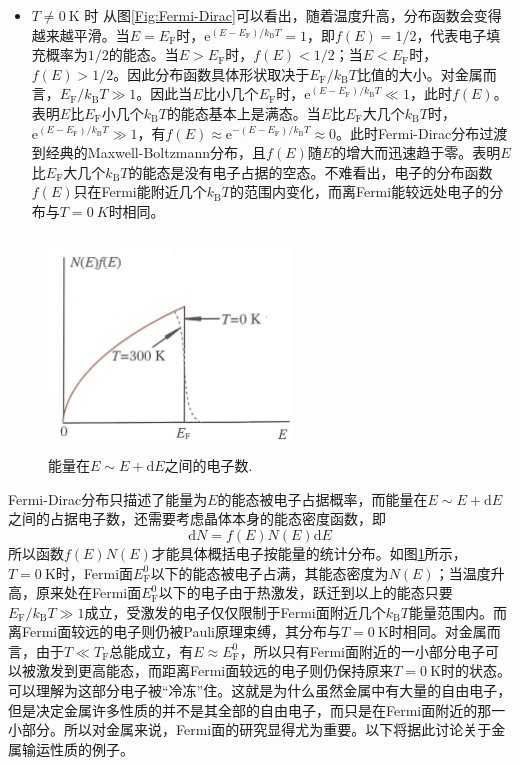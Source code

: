 \begin{itemize}
\item $T\neq0~\mathrm{K}$ 时 
	从图\ref{Fig:Fermi-Dirac}可以看出，随着温度升高，分布函数会变得越来越平滑。当$E=E_{\mathrm{F}}$时，$\mathrm{e}^{(E-E_{\mathrm{F}})/k_{\mathrm{B}}T}=1$，即$f(E)=1/2$，代表电子填充概率为$1/2$的能态。当$E>E_{\mathrm{F}}$时，$f(E)<1/2$；当$E<E_{\mathrm{F}}$时， $f(E)>1/2$。因此分布函数具体形状取决于$E_{\mathrm{F}}/k_{\mathrm{B}}T$比值的大小。对金属而言，$E_{\mathrm{F}}/k_{\mathrm{B}}T\gg1$。因此当$E$比小几个$E_{\mathrm{F}}$时，$\mathrm{e}^{(E-E_{\mathrm{F}})/k_{\mathrm{B}}T}\ll1$，此时$f(E)$。表明$E$比$E_{\mathrm{F}}$小几个$k_{\mathrm{B}}T$的能态基本上是满态。当$E$比$E_{\mathrm{F}}$大几个$k_{\mathrm{B}}T$时，$\mathrm{e}^{(E-E_{\mathrm{F}})/k_{\mathrm{B}}T}\gg1$，有$f(E)\approx\mathrm{e}^{-(E-E_{\mathrm{F}})/k_{\mathrm{B}}T}\approx0$。此时Fermi-Dirac分布过渡到经典的Maxwell-Boltzmann分布，且$f(E)$随$E$的增大而迅速趋于零。表明$E$比$E_{\mathrm{F}}$大几个$k_{\mathrm{B}}T$的能态是没有电子占据的空态。不难看出，电子的分布函数$f(E)$只在Fermi能附近几个$k_{\mathrm{B}}T$的范围内变化，而离Fermi能较远处电子的分布与$T=0~K$时相同。
\end{itemize}

\begin{figure}[h!]
\centering
\vspace*{-0.10in}
\includegraphics[height=2.25in,width=2.55in,viewport=0 0 58 50,clip]{Figures/Fermi-DOS.png}
\caption{\small \textrm{能量在$E\sim E+\mathrm{d}E$之间的电子数.}}%
\label{Fig:fE-DOS}
\end{figure}
Fermi-Dirac分布只描述了能量为$E$的能态被电子占据概率，而能量在$E\sim E+\mathrm{d}E$之间的占据电子数，还需要考虑晶体本身的能态密度函数，即
\begin{equation}
	\mathrm{d}N=f(E)N(E)\mathrm{d}E
	\label{eq:DOS-dN}
\end{equation}
所以函数$f(E)N(E)$才能具体概括电子按能量的统计分布。如图\ref{Fig:fE-DOS}所示，$T=0~\mathrm{K}$时，Fermi面$E_{\mathrm{F}}^0$以下的能态被电子占满，其能态密度为$N(E)$；当温度升高，原来处在Fermi面$E_{\mathrm{F}}^0$以下的电子由于热激发，跃迁到以上的能态只要$E_{\mathrm{F}}/k_{\mathrm{B}}T\gg1$成立，受激发的电子仅仅限制于Fermi面附近几个$k_{\mathrm{B}}T$能量范围内。而离Fermi面较远的电子则仍被Pauli原理束缚，其分布与$T=0~\mathrm{K}$时相同。对金属而言，由于$T\ll T_{\mathrm{F}}$总能成立，有$E\approx E_{\mathrm{F}}^0$，所以只有Fermi面附近的一小部分电子可以被激发到更高能态，而距离Fermi面较远的电子则仍保持原来$T=0~\mathrm{K}$时的状态。可以理解为这部分电子被``冷冻''住。这就是为什么虽然金属中有大量的自由电子，但是决定金属许多性质的并不是其全部的自由电子，而只是在Fermi面附近的那一小部分。所以对金属来说，Fermi面的研究显得尤为重要。以下将据此讨论关于金属输运性质的例子。

